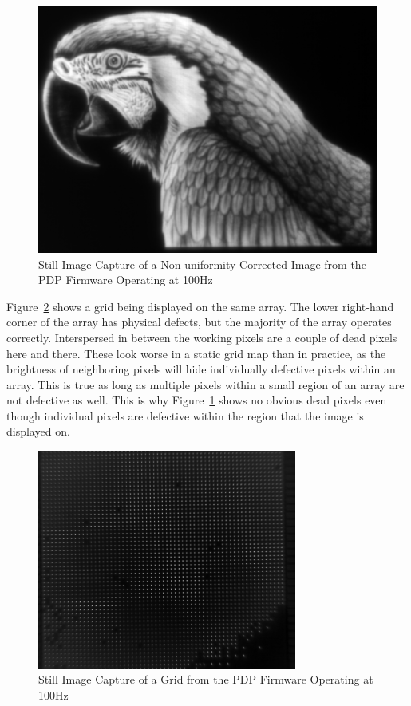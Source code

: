             \begin{figure}[t]
                \centering
                \includegraphics{fig/pdp_bird.png}
                \caption{Still Image Capture of a Non-uniformity Corrected Image from the PDP Firmware Operating at 100Hz}
                \label{fig:pdp_bird}
            \end{figure}

            Figure~\ref{fig:pdp_grid} shows a grid being displayed on the same array. The lower right-hand corner of the array has physical defects, but the majority of the array operates correctly. Interspersed in between the working pixels are a couple of dead pixels here and there. These look worse in a static grid map than in practice, as the brightness of neighboring pixels will hide individually defective pixels within an array. This is true as long as multiple pixels within a small region of an array are not defective as well. This is why Figure~\ref{fig:pdp_bird} shows no obvious dead pixels even though individual pixels are defective within the region that the image is displayed on.

            \begin{figure}[t]
                \centering
                \includegraphics[width=0.76\textwidth]{fig/pdp_grid.png}
                \caption{Still Image Capture of a Grid from the PDP Firmware Operating at 100Hz}
                \label{fig:pdp_grid}
            \end{figure}


